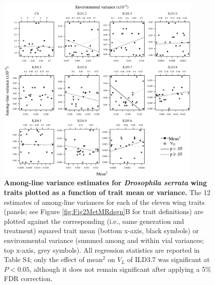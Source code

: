 \FloatBarrier
\newpage
\begin{figure}
    \centering
    \includegraphics[width=0.9\textwidth]{Chp2_Meta/Fig6VlonPred.eps}
    \caption[Among-line variance estimates for \textit{Drosophila serrata} wing traits plotted as a function of trait mean or variance.]{\textbf{Among-line variance estimates for \textit{Drosophila serrata} wing traits plotted as a function of trait mean or variance.} The 12 estimates of among-line variances for each of the eleven wing traits (panels; see Figure \ref{fig:Fig2MetMRdsgn}B for trait definitions) are plotted against the  corresponding (i.e., same generation and treatment) squared trait mean (bottom x-axis, black symbols) or environmental variance (summed among and within vial variances; top x-axis, grey symbols). All regression statistics are reported in Table S4; only the effect of mean$^2$ on $V_L$ of ILD3.7 was significant at $P < 0.05$, although it does not remain significant after applying a 5\% FDR correction. }
    \label{fig:Fig6Vl_Denom}
\end{figure}



